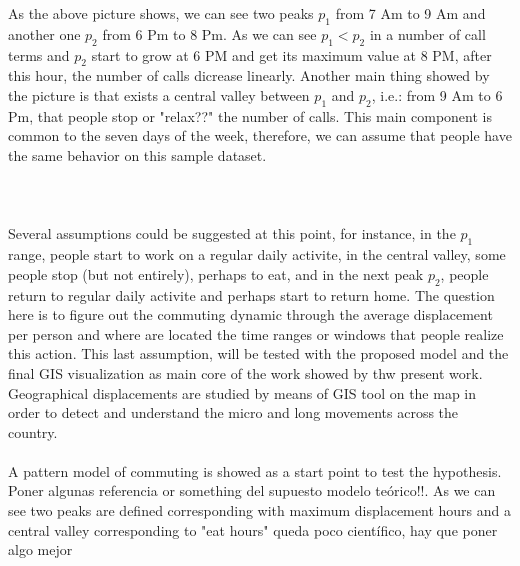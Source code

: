 As the above picture shows, we can see two peaks $p_1$ from 7 Am to 9 Am and another one $p_2$ from 6 Pm to 8 Pm. As we can see $p_1 < p_2$ in a number of call terms and $p_2$ start to grow at 6 PM and get its maximum value at 8 PM, after this hour, the number of calls dicrease linearly. Another main thing showed by the picture is that exists a central valley between $p_1$ and $p_2$, i.e.:  from 9 Am to 6 Pm, that people stop or "relax??" the number of calls. 
This main component is common to the seven days of the week, therefore, we can assume that people have the same behavior on this sample dataset.
\\
\\
\\
\\
Several assumptions could be suggested at this point, for instance, in the $p_1$ range, people start to work on a regular daily activite, in the central valley, some people stop (but not entirely), perhaps to eat, and in the next peak $p_2$, people return to regular daily activite and perhaps start to return home.
The question here is to figure out the commuting dynamic through the average displacement per person and where are located the time ranges or windows that people realize this action.  This last assumption, will be tested with the proposed model and the final GIS visualization as main core of the work showed by thw present work.  Geographical displacements are studied by means of GIS tool on the map in order to detect and understand the micro and long movements across the country. 
\\
\\
A pattern model of commuting is showed as a start point to test the hypothesis. {\color{red} Poner algunas referencia or something del supuesto modelo teórico!!}. As we can see two peaks are defined corresponding with maximum displacement hours and a central valley corresponding to "eat hours"  {\color{red} queda poco científico, hay que poner algo mejor}

\newpage

